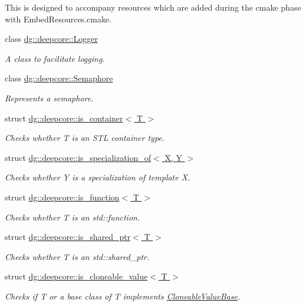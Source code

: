\begin{DoxyCompactItemize}
\begin{DoxyCompactList}
This is designed to accompany resources which are added during the cmake phase with Embed\+Resources.\+cmake. \end{DoxyCompactList}\item 
class \hyperlink{classdg_1_1deepcore_1_1_logger}{dg\+::deepcore\+::\+Logger}
\begin{DoxyCompactList}\small\item\em A class to facilitate logging. \end{DoxyCompactList}\item 
class \hyperlink{classdg_1_1deepcore_1_1_semaphore}{dg\+::deepcore\+::\+Semaphore}
\begin{DoxyCompactList}\small\item\em Represents a semaphore. \end{DoxyCompactList}\item 
struct \hyperlink{structdg_1_1deepcore_1_1is__container}{dg\+::deepcore\+::is\+\_\+container$<$ T $>$}
\begin{DoxyCompactList}\small\item\em Checks whether {\ttfamily T} is an S\+TL container type. \end{DoxyCompactList}\item 
struct \hyperlink{structdg_1_1deepcore_1_1is__specialization__of}{dg\+::deepcore\+::is\+\_\+specialization\+\_\+of$<$ X, Y $>$}
\begin{DoxyCompactList}\small\item\em Checks whether {\ttfamily Y} is a specialization of template {\ttfamily X}. \end{DoxyCompactList}\item 
struct \hyperlink{structdg_1_1deepcore_1_1is__function}{dg\+::deepcore\+::is\+\_\+function$<$ T $>$}
\begin{DoxyCompactList}\small\item\em Checks whether T is an {\ttfamily std\+::function}. \end{DoxyCompactList}\item 
struct \hyperlink{structdg_1_1deepcore_1_1is__shared__ptr}{dg\+::deepcore\+::is\+\_\+shared\+\_\+ptr$<$ T $>$}
\begin{DoxyCompactList}\small\item\em Checks whether T is an {\ttfamily std\+::shared\+\_\+ptr}. \end{DoxyCompactList}\item 
struct \hyperlink{structdg_1_1deepcore_1_1is__cloneable__value}{dg\+::deepcore\+::is\+\_\+cloneable\+\_\+value$<$ T $>$}
\begin{DoxyCompactList}\small\item\em Checks if {\ttfamily T} or a base class of {\ttfamily T} implements \hyperlink{structdg_1_1deepcore_1_1_cloneable_value_base}{Cloneable\+Value\+Base}. \end{DoxyCompactList}\item 

\end{DoxyCompactItemize}
